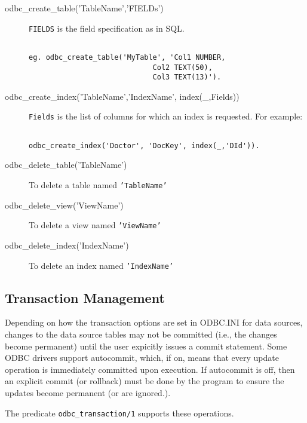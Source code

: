 \begin{description}

\item[odbc\_create\_table('TableName','FIELDs')]
        {\tt FIELDS} is the field specification as in SQL.
\begin{verbatim}

eg. odbc_create_table('MyTable', 'Col1 NUMBER,
                             Col2 TEXT(50),
                             Col3 TEXT(13)').
\end{verbatim}


\item[odbc\_create\_index('TableName','IndexName', index(\_,Fields))]
        {\tt Fields} is the list of columns for which an index
        is requested.  For example:
\begin{verbatim}

odbc_create_index('Doctor', 'DocKey', index(_,'DId')).
\end{verbatim}

\item[odbc\_delete\_table('TableName')] To delete a table named {\tt 'TableName'}

\item[odbc\_delete\_view('ViewName')] To delete a view named {\tt 'ViewName'}

\item[odbc\_delete\_index('IndexName')] To delete an index named {\tt 'IndexName'}
\end{description}

\subsection{Transaction Management}\label{TransactionManagement}

Depending on how the transaction options are set in ODBC.INI for data
sources, changes to the data source tables may not be
committed (i.e., the changes become permanent) until the user expicitly
issues a commit statement.  Some ODBC drivers support autocommit,
which, if on, means that every update operation is immediately
committed upon execution.  If autocommit is off, then an explicit
commit (or rollback) must be done by the program to ensure the updates 
become permanent (or are ignored.).

The predicate {\tt odbc\_transaction/1} supports these operations.

